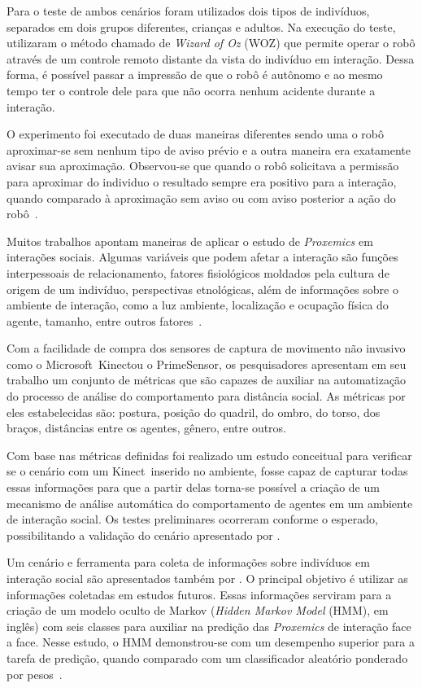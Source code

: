 Para o teste de ambos cenários foram utilizados dois tipos de indivíduos, separados em dois grupos diferentes, crianças e adultos. Na execução do teste,  utilizaram o método chamado de \emph{Wizard of Oz} (WOZ) que permite operar o robô através de um controle remoto distante da vista do indivíduo em interação. Dessa forma, é possível passar a impressão de que o robô é autônomo e ao mesmo tempo ter o controle dele para que não ocorra nenhum acidente durante a interação.

O experimento foi executado de duas maneiras diferentes sendo uma o robô aproximar-se sem nenhum tipo de aviso prévio e a outra maneira era exatamente avisar sua aproximação. Observou-se que quando o robô solicitava a permissão para aproximar do individuo o resultado sempre era positivo para a interação, quando comparado à aproximação sem aviso ou com aviso posterior a ação do robô~\cite{Okita:2012}.

Muitos trabalhos apontam maneiras de aplicar o estudo de \emph{Proxemics} em interações sociais. Algumas variáveis que podem afetar a interação são funções interpessoais de relacionamento, fatores fisiológicos moldados pela cultura de origem de um indivíduo, perspectivas etnológicas, além de informações sobre o ambiente de interação, como a luz ambiente, localização e ocupação física do agente, tamanho, entre outros fatores~\cite{Mead:2011b}.

Com a facilidade de compra dos sensores de captura de movimento não invasivo como o Microsoft\textregistered\ Kinect\textregistered ou o PrimeSensor\textregistered, os pesquisadores  apresentam em seu trabalho um conjunto de métricas que são capazes de auxiliar na automatização do processo de análise do comportamento para distância social. As métricas por eles estabelecidas são: postura, posição do quadril, do ombro, do torso, dos braços, distâncias entre os agentes, gênero, entre outros.

Com base nas métricas definidas foi realizado um estudo conceitual para verificar se o cenário com um Kinect\textregistered\ inserido no ambiente, fosse capaz de capturar todas essas informações para que a partir delas torna-se possível a criação de um mecanismo de análise automática do comportamento de agentes em um ambiente de interação social. Os testes preliminares ocorreram conforme o esperado, possibilitando a validação do cenário apresentado por .

Um cenário e ferramenta para coleta de informações sobre indivíduos em interação social são apresentados também por . O principal objetivo é utilizar as informações coletadas em estudos futuros. Essas informações serviram para a criação de um modelo oculto de Markov (\emph{Hidden Markov Model} (HMM), em inglês) com seis classes para auxiliar na predição das \emph{Proxemics} de interação face a face. Nesse estudo, o HMM demonstrou-se com um desempenho superior para a tarefa de predição, quando comparado com um classificador aleatório ponderado por pesos~\cite{Mead:2011}.

